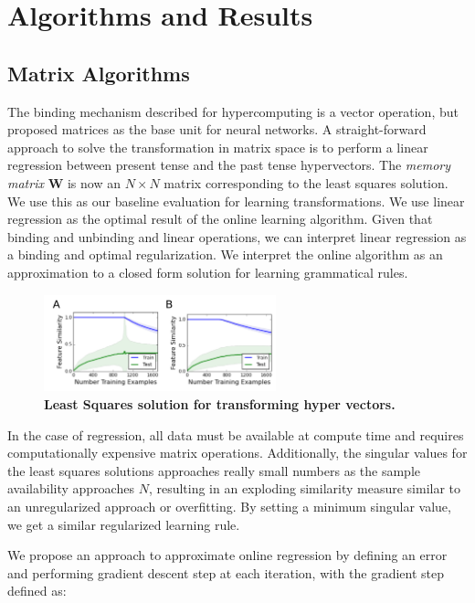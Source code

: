 \documentclass{article}
\begin{document}
\section{Algorithms and Results}

\subsection{Matrix Algorithms}

The binding mechanism described for hypercomputing is a vector operation, but \citet{Rumelhart1986a} proposed matrices as the base unit for neural networks. A straight-forward approach to solve the transformation in matrix space is to perform a linear regression between present tense and the past tense hypervectors. The \emph{memory matrix} $\mathbf{W}$ is now an $N \times N$ matrix corresponding to the least squares solution. We use this as our baseline evaluation for learning transformations. We use linear regression as the optimal result of the online learning algorithm. Given that binding and unbinding and linear operations, we can interpret linear regression as a binding and optimal regularization. We interpret the online algorithm as an approximation to a closed form solution for learning grammatical rules. 

\begin{figure}
\centering
\includegraphics[width=0.6\textwidth]{regression_issue-170518.png}
\caption{\textbf{Least Squares solution for transforming hyper vectors.}}
\end{figure}

In the case of regression, all data must be available at compute time and requires computationally expensive matrix operations. Additionally, the singular values for the least squares solutions approaches really small numbers as the sample availability approaches $N$, resulting in an exploding similarity measure similar to an unregularized approach or overfitting. By setting a minimum singular value, we get a similar regularized learning rule.

We propose an approach to approximate online regression by defining an error and performing gradient descent step at each iteration, with the gradient step defined as:
\end{document}
